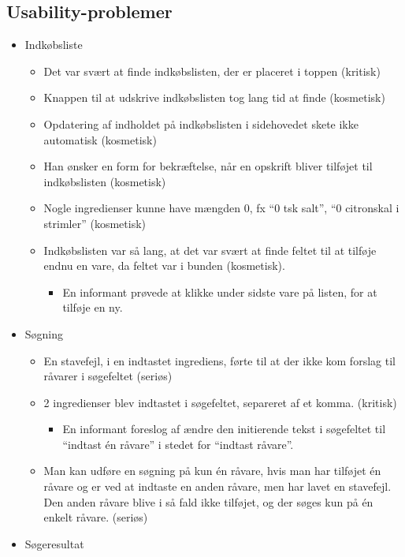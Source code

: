 \subsection{Usability-problemer}
 \begin{itemize}[noitemsep]
 \item Indkøbsliste
  \begin{itemize}[noitemsep]
  \item Det var svært at finde indkøbslisten, der er placeret i toppen (kritisk)
  \item Knappen til at udskrive indkøbslisten tog lang tid at finde (kosmetisk)
  \item Opdatering af indholdet på indkøbslisten i sidehovedet skete ikke automatisk (kosmetisk)
  \item Han ønsker en form for bekræftelse, når en opskrift bliver tilføjet til indkøbslisten (kosmetisk)
  \item Nogle ingredienser kunne have mængden 0, fx “0 tsk salt”, “0 citronskal i strimler” (kosmetisk)
  \item Indkøbslisten var så lang, at det var svært at finde feltet til at tilføje endnu en vare, da feltet var i bunden (kosmetisk).
   \begin{itemize}[noitemsep]
   \item En informant prøvede at klikke under sidste vare på listen, for at tilføje en ny.
   \end{itemize}
  \end{itemize}
 \item Søgning
  \begin{itemize}[noitemsep]
  \item En stavefejl, i en indtastet ingrediens, førte til at der ikke kom forslag til råvarer i søgefeltet (seriøs)
  \item 2 ingredienser blev indtastet i søgefeltet, separeret af et komma. (kritisk)
   \begin{itemize}[noitemsep]
   \item En informant foreslog af ændre den initierende tekst i søgefeltet til ``indtast én råvare'' i stedet for ``indtast råvare''.
   \end{itemize}
  \item Man kan udføre en søgning på kun én råvare, hvis man har tilføjet én råvare og er ved at indtaste en anden råvare, men har lavet en stavefejl. Den anden råvare blive i så fald ikke tilføjet, og der søges kun på én enkelt råvare. (seriøs)
  \end{itemize}
 \item Søgeresultat

\end{itemize}
